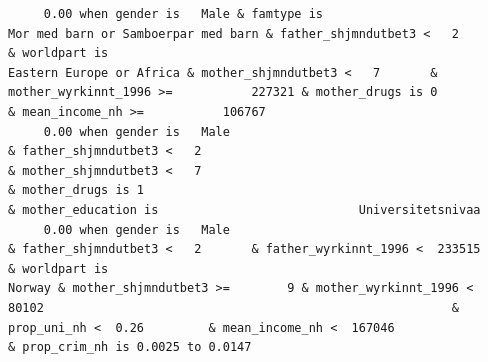 \documentclass[
  letterpaper,
  DIV=11,
  numbers=noendperiod]{scrreprt}
\begin{document}
\begin{verbatim}
     0.00 when gender is   Male & famtype is                              Mor med barn or Samboerpar med barn & father_shjmndutbet3 <   2                                                  & worldpart is                                                                                                            Eastern Europe or Africa & mother_shjmndutbet3 <   7       & mother_wyrkinnt_1996 >=           227321 & mother_drugs is 0                                                         & mean_income_nh >=           106767                                                                                                                                                                                                                                                                                                                                            
     0.00 when gender is   Male                                                                               & father_shjmndutbet3 <   2                                                                                                                                                                                                     & mother_shjmndutbet3 <   7                                                  & mother_drugs is 1                                                                                                                                                                                                  & mother_education is                            Universitetsnivaa                                                                                                                                                                     
     0.00 when gender is   Male                                                                               & father_shjmndutbet3 <   2       & father_wyrkinnt_1996 <  233515           & worldpart is                                                                                                                              Norway & mother_shjmndutbet3 >=        9 & mother_wyrkinnt_1996 <   80102                                                         & prop_uni_nh <  0.26         & mean_income_nh <  167046                                        & prop_crim_nh is 0.0025 to 0.0147                                                                                                                                                                                                                                                                            

\end{verbatim}
\end{document}
